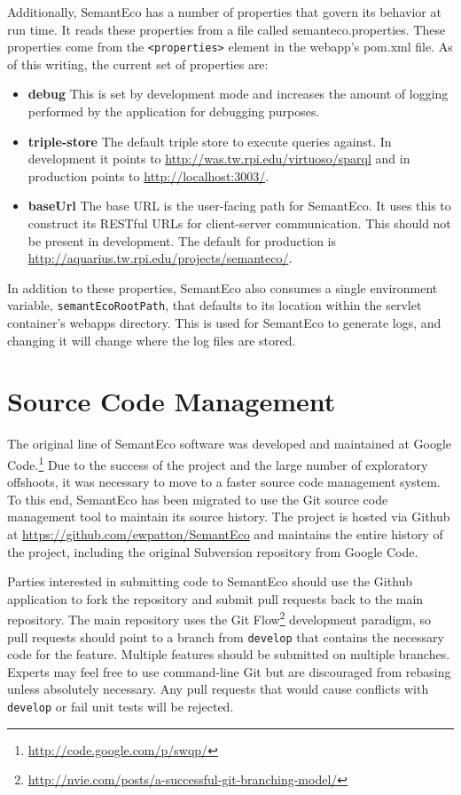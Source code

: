 \documentclass[letterpaper]{report}
\begin{document}
Additionally, SemantEco has a number of properties that govern its behavior at run time. It reads these properties from a file called semanteco.properties. These properties come from the \texttt{<properties>} element in the webapp's pom.xml file. As of this writing, the current set of properties are:

\begin{itemize}
\item \textbf{debug} This is set by development mode and increases the amount of logging performed by the application for debugging purposes.
\item \textbf{triple-store} The default triple store to execute queries against. In development it points to \url{http://was.tw.rpi.edu/virtuoso/sparql} and in production points to \url{http://localhost:3003/}.
\item \textbf{baseUrl} The base URL is the user-facing path for SemantEco. It uses this to construct its RESTful URLs for client-server communication. This should not be present in development. The default for production is \url{http://aquarius.tw.rpi.edu/projects/semanteco/}.
\end{itemize}

In addition to these properties, SemantEco also consumes a single environment variable, \texttt{semantEcoRootPath}, that defaults to its location within the servlet container's webapps directory. This is used for SemantEco to generate logs, and changing it will change where the log files are stored.

\chapter{Source Code Management}
The original line of SemantEco software was developed and maintained at Google Code.\footnote{\url{http://code.google.com/p/swqp/}} Due to the success of the project and the large number of exploratory offshoots, it was necessary to move to a faster source code management system. To this end, SemantEco has been migrated to use the Git source code management tool to maintain its source history. The project is hosted via Github at \url{https://github.com/ewpatton/SemantEco} and maintains the entire history of the project, including the original Subversion repository from Google Code.

Parties interested in submitting code to SemantEco should use the Github application to fork the repository and submit pull requests back to the main repository. The main repository uses the Git Flow\footnote{\url{http://nvie.com/posts/a-successful-git-branching-model/}} development paradigm, so pull requests should point to a branch from \texttt{develop} that contains the necessary code for the feature. Multiple features should be submitted on multiple branches. Experts may feel free to use command-line Git but are discouraged from rebasing unless absolutely necessary. Any pull requests that would cause conflicts with \texttt{develop} or fail unit tests will be rejected.

\cleardoublepage
{}
\renewcommand{\bibname}{References}



\cleardoublepage
{}
\printindex
\end{document}
